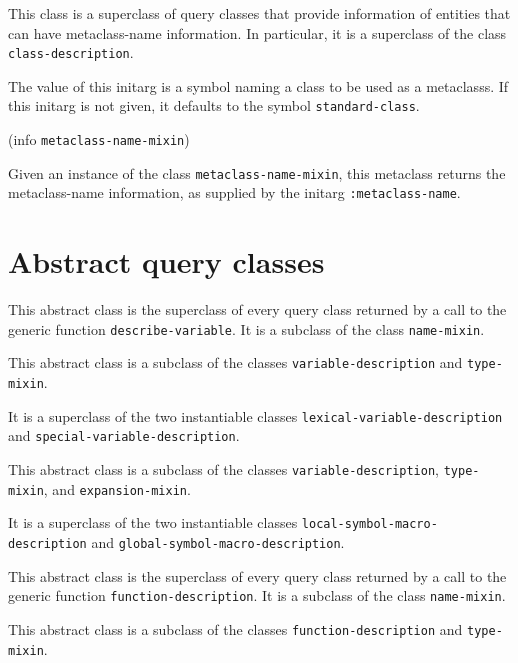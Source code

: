 This class is a superclass of query classes that provide information
of entities that can have metaclass-name information.  In
particular, it is a superclass of the class
\texttt{class-description}.


The value of this initarg is a symbol naming a class to be used as a
metaclasss.  If this initarg is not given, it defaults to the symbol
\texttt{standard-class}.

 {(info {\tt metaclass-name-mixin})}

Given an instance of the class \texttt{metaclass-name-mixin}, this
metaclass returns the metaclass-name information, as supplied by the
initarg \texttt{:metaclass-name}.

\section{Abstract query classes}


This abstract class is the superclass of every query class returned by
a call to the generic function \texttt{describe-variable}.  It is a
subclass of the class \texttt{name-mixin}.


This abstract class is a subclass of the classes
\texttt{variable-description} and \texttt{type-mixin}.

It is a superclass of the two instantiable classes
\texttt{lexical-variable-description} and
\texttt{special-variable-description}.


This abstract class is a subclass of the classes
\texttt{variable-description}, \texttt{type-mixin}, and
\texttt{expansion-mixin}.

It is a superclass of the two instantiable classes
\texttt{local-symbol-macro-description} and
\texttt{global-symbol-macro-description}.


This abstract class is the superclass of every query class returned by
a call to the generic function \texttt{function-description}.  It is a
subclass of the class \texttt{name-mixin}.


This abstract class is a subclass of the classes
\texttt{function-description} and \texttt{type-mixin}.

